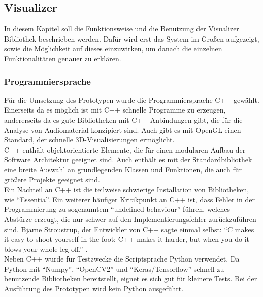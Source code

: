 \documentclass[11pt,a4paper]{article}
\begin{document}
\newpage
\subsection{Visualizer}
In diesem Kapitel soll die Funktionsweise und die Benutzung der Visualizer Bibliothek beschrieben werden. Dafür wird erst das System im Großen aufgezeigt, sowie die Möglichkeit auf dieses einzuwirken, um danach die einzelnen Funktionalitäten genauer zu erklären.

\subsubsection{Programmiersprache}
Für die Umsetzung des Prototypen wurde die Programmiersprache C++ gewählt. Einerseits da es möglich ist mit C++ schnelle Programme zu erzeugen, andererseits da es gute Bibliotheken mit C++ Anbindungen gibt, die für die Analyse von Audiomaterial konzipiert sind. Auch  gibt es mit OpenGL einen Standard, der schnelle 3D-Visualisierungen ermöglicht.\\
C++ enthält objektorientierte Elemente, die für einen modularen Aufbau der Software Architektur geeignet sind. Auch enthält es mit der Standardbibliothek eine breite Auswahl an grundlegenden Klassen und Funktionen, die auch für größere Projekte geeignet sind.\\
Ein Nachteil an C++ ist die teilweise schwierige Installation von Bibliotheken, wie ``Essentia''. Ein weiterer häufiger Kritikpunkt an C++ ist, dass Fehler in der Programmierung zu sogenanntem ``undefined behaviour'' führen, welches Abstürze erzeugt, die nur schwer auf den Implementierungsfehler zurückzuführen sind. Bjarne Stroustrup, der Entwickler von C++ sagte einmal selbst: ``C makes it easy to shoot yourself in the foot; C++ makes it harder, but when you do it blows your whole leg off.'' \cite{BjarneStroustrupCite}.\\
Neben C++ wurde für Testzwecke die Scriptsprache Python verwendet. Da Python mit ``Numpy'', ``OpenCV2'' und ``Keras/Tensorflow'' schnell zu benutzende Bibliotheken bereitstellt, eignet es sich gut für kleinere Tests. Bei der Ausführung des Prototypen wird kein Python ausgeführt.
\end{document}
